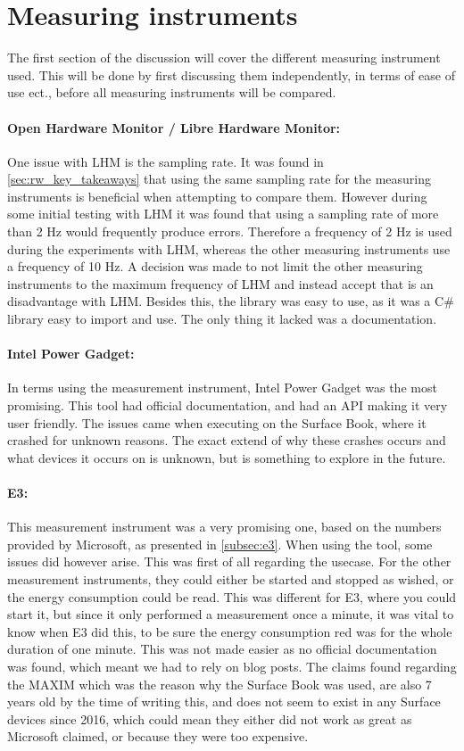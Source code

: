 \section{Measuring instruments}

The first section of the discussion will cover the different measuring instrument used. This will be done by first discussing them independently, in terms of ease of use ect., before all measuring instruments will be compared.

\paragraph*{Open Hardware Monitor / Libre Hardware Monitor:} One issue with LHM is the sampling rate. It was found in \cref{sec:rw_key_takeaways} that using the same sampling rate for the measuring instruments is beneficial when attempting to compare them. However during some initial testing with LHM it was found that using a sampling rate of more than 2 Hz would frequently produce errors. Therefore a frequency of 2 Hz is used during the experiments with LHM, whereas the other measuring instruments use a frequency of 10 Hz. A decision was made to not limit the other measuring instruments to the maximum frequency of LHM and instead accept that is an disadvantage with LHM. Besides this, the library was easy to use, as it was a C\# library easy to import and use. The only thing it lacked was a documentation.

\paragraph*{Intel Power Gadget:} In terms using the measurement instrument, Intel Power Gadget was the most promising. This tool had official documentation, and had an API making it very user friendly. The issues came when executing on the Surface Book, where it crashed for unknown reasons. The exact extend of why these crashes occurs and what devices it occurs on is unknown, but is something to explore in the future.

\paragraph*{E3:} This measurement instrument was a very promising one, based on the numbers provided by Microsoft, as presented in \cref{subsec:e3}. When using the tool, some issues did however arise. This was first of all regarding the usecase. For the other measurement instruments, they could either be started and stopped as wished, or the energy consumption could be read. This was different for E3, where you could start it, but since it only performed a measurement once a minute, it was vital to know when E3 did this, to be sure the energy consumption red was for the whole duration of one minute. This was not made easier as no official documentation was found, which meant we had to rely on blog posts. The claims found regarding the MAXIM which was the reason why the Surface Book was used, are also 7 years old by the time of writing this, and does not seem to exist in any Surface devices since 2016, which could mean they either did not work as great as Microsoft claimed, or because they were too expensive.


